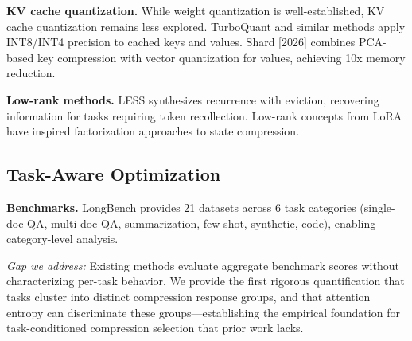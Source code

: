\textbf{KV cache quantization.} While weight quantization is well-established, KV cache quantization remains less explored. TurboQuant and similar methods apply INT8/INT4 precision to cached keys and values. Shard [2026] combines PCA-based key compression with vector quantization for values, achieving 10x memory reduction.

\textbf{Low-rank methods.} LESS \citep{dong2024less} synthesizes recurrence with eviction, recovering information for tasks requiring token recollection. Low-rank concepts from LoRA \citep{hu2021lora} have inspired factorization approaches to state compression.

\subsection{Task-Aware Optimization}

\textbf{Benchmarks.} LongBench \citep{bai2023longbench} provides 21 datasets across 6 task categories (single-doc QA, multi-doc QA, summarization, few-shot, synthetic, code), enabling category-level analysis.

\emph{Gap we address:} Existing methods evaluate aggregate benchmark scores without characterizing per-task behavior. We provide the first rigorous quantification that tasks cluster into distinct compression response groups, and that attention entropy can discriminate these groups---establishing the empirical foundation for task-conditioned compression selection that prior work lacks.
